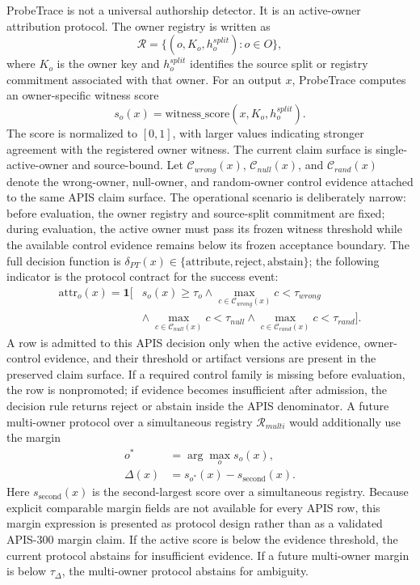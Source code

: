 ProbeTrace is not a universal authorship detector. It is an active-owner attribution protocol. The owner registry is written as
\begin{equation}
  \mathcal{R} = \{(o, K_o, h^{split}_o): o\in O\},
\end{equation}
where $K_o$ is the owner key and $h^{split}_o$ identifies the source split or registry commitment associated with that owner. For an output $x$, ProbeTrace computes an owner-specific witness score
\begin{equation}
  s_o(x)=\mathrm{witness\_score}(x,K_o,h^{split}_o).
\end{equation}
The score is normalized to $[0,1]$, with larger values indicating stronger agreement with the registered owner witness. The current claim surface is single-active-owner and source-bound. Let $\mathcal{C}_{wrong}(x)$, $\mathcal{C}_{null}(x)$, and $\mathcal{C}_{rand}(x)$ denote the wrong-owner, null-owner, and random-owner control evidence attached to the same APIS claim surface. The operational scenario is deliberately narrow: before evaluation, the owner registry and source-split commitment are fixed; during evaluation, the active owner must pass its frozen witness threshold while the available control evidence remains below its frozen acceptance boundary. The full decision function is $\delta_{PT}(x)\in\{\mathrm{attribute},\mathrm{reject},\mathrm{abstain}\}$; the following indicator is the protocol contract for the success event:
\begin{align}
  \mathrm{attr}_o(x)
  = \mathbf{1}\bigl[
  &s_o(x)\geq\tau_o
  \wedge \max_{c\in\mathcal{C}_{wrong}(x)}c<\tau_{wrong} \nonumber\\
  &\wedge\ \max_{c\in\mathcal{C}_{null}(x)}c<\tau_{null}
  \wedge \max_{c\in\mathcal{C}_{rand}(x)}c<\tau_{rand}
  \bigr].
\end{align}
A row is admitted to this APIS decision only when the active evidence, owner-control evidence, and their threshold or artifact versions are present in the preserved claim surface. If a required control family is missing before evaluation, the row is nonpromoted; if evidence becomes insufficient after admission, the decision rule returns reject or abstain inside the APIS denominator.
A future multi-owner protocol over a simultaneous registry $\mathcal{R}_{multi}$ would additionally use the margin
\begin{align}
  o^\ast &= \arg\max_o s_o(x),\\
  \Delta(x) &= s_{o^\ast}(x)-s_{\mathrm{second}}(x).
\end{align}
Here $s_{\mathrm{second}}(x)$ is the second-largest score over a simultaneous registry. Because explicit comparable margin fields are not available for every APIS row, this margin expression is presented as protocol design rather than as a validated APIS-300 margin claim. If the active score is below the evidence threshold, the current protocol abstains for insufficient evidence. If a future multi-owner margin is below $\tau_{\Delta}$, the multi-owner protocol abstains for ambiguity.

